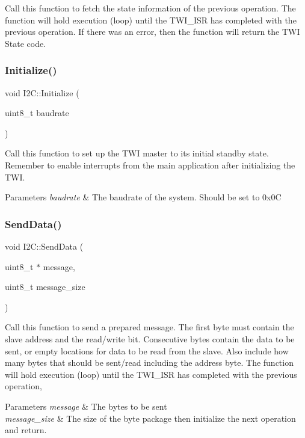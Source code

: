 Call this function to fetch the state information of the previous operation. The function will hold execution (loop) until the T\+W\+I\+\_\+\+I\+SR has completed with the previous operation. If there was an error, then the function will return the T\+WI State code. \hypertarget{class_i2_c_acfdd142a63b224f178f3edda5f30f2aa}{}\label{class_i2_c_acfdd142a63b224f178f3edda5f30f2aa} 
\subsubsection{\texorpdfstring{Initialize()}{Initialize()}}
{\footnotesize\ttfamily void I2\+C\+::\+Initialize (\begin{DoxyParamCaption}\item[{uint8\+\_\+t}]{baudrate }\end{DoxyParamCaption})}

Call this function to set up the T\+WI master to its initial standby state. Remember to enable interrupts from the main application after initializing the T\+WI. 
\begin{DoxyParams}{Parameters}
{\em baudrate} & The baudrate of the system. Should be set to 0x0C \\
\hline
\end{DoxyParams}
\hypertarget{class_i2_c_a6b0a26e4ebcae7eee8920a70b77fd5c2}{}\label{class_i2_c_a6b0a26e4ebcae7eee8920a70b77fd5c2} 
\subsubsection{\texorpdfstring{Send\+Data()}{SendData()}}
{\footnotesize\ttfamily void I2\+C\+::\+Send\+Data (\begin{DoxyParamCaption}\item[{uint8\+\_\+t $\ast$}]{message,  }\item[{uint8\+\_\+t}]{message\+\_\+size }\end{DoxyParamCaption})}

Call this function to send a prepared message. The first byte must contain the slave address and the read/write bit. Consecutive bytes contain the data to be sent, or empty locations for data to be read from the slave. Also include how many bytes that should be sent/read including the address byte. The function will hold execution (loop) until the T\+W\+I\+\_\+\+I\+SR has completed with the previous operation, 
\begin{DoxyParams}{Parameters}
{\em message} & The bytes to be sent \\
\hline
{\em message\+\_\+size} & The size of the byte package then initialize the next operation and return. \\
\hline
\end{DoxyParams}
\hypertarget{class_i2_c_af8c970cb20a2b5bdcf80ef35c662658f}{}\label{class_i2_c_af8c970cb20a2b5bdcf80ef35c662658f} 
